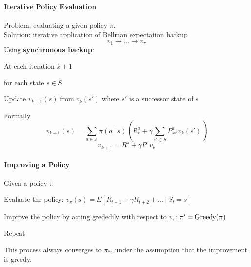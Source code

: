 \documentclass[10pt]{report}
\begin{document}
\paragraph{Iterative Policy Evaluation} Problem: evaluating a given policy $\pi$.\\
Solution: iterative application of Bellman expectation backup
$$v_1\rightarrow \ldots \rightarrow v_\pi$$
Using \textbf{synchronous backup}:
\begin{list}{}{}
	\item At each iteration $k+1$
	\item for each state $s\in S$
	\item Update $v_{k+1}(s)$ from $v_k(s')$ where $s'$ is a successor state of $s$
\end{list}
Formally
$$v_{k+1}(s) = \sum_{a\in A} \pi(a\:|\:s)\left(R_s^a+\gamma\sum_{s'\in S}P_{ss'}^av_k(s')\right)$$
$$v_{k+1} = R^\pi +\gamma P^\pi v_k$$
\paragraph{Improving a Policy} Given a policy $\pi$\begin{list}{}{}
	\item Evaluate the policy: $v_\pi(s) = E[R_{t+1} + \gamma R_{t+2} + \ldots\:|\:S_t =s]$
	\item Improve the policy by acting grededily with respect to $v_\pi$:
	$\pi' = \hbox{Greedy}(\pi)$
	\item Repeat
\end{list}
This process always converges to $\pi_*$, under the assumption that the improvement is greedy.
\end{document}
